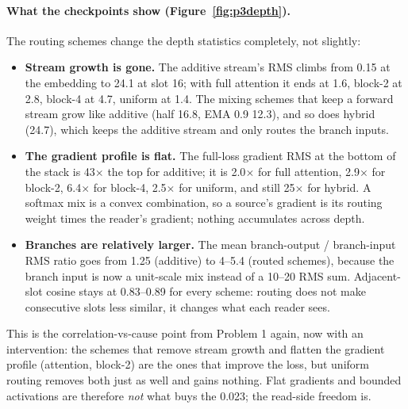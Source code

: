\paragraph{What the checkpoints show (Figure~\ref{fig:p3depth}).} The routing schemes change the depth statistics completely, not slightly:
\begin{itemize}[nosep]
\item \textbf{Stream growth is gone.} The additive stream's RMS climbs from 0.15 at the embedding to 24.1 at slot 16; with full attention it ends at 1.6, block-2 at 2.8, block-4 at 4.7, uniform at 1.4. The mixing schemes that keep a forward stream grow like additive (half 16.8, EMA 0.9 12.3), and so does hybrid (24.7), which keeps the additive stream and only routes the branch inputs.
\item \textbf{The gradient profile is flat.} The full-loss gradient RMS at the bottom of the stack is 43$\times$ the top for additive; it is 2.0$\times$ for full attention, 2.9$\times$ for block-2, 6.4$\times$ for block-4, 2.5$\times$ for uniform, and still 25$\times$ for hybrid. A softmax mix is a convex combination, so a source's gradient is its routing weight times the reader's gradient; nothing accumulates across depth.
\item \textbf{Branches are relatively larger.} The mean branch-output / branch-input RMS ratio goes from 1.25 (additive) to 4--5.4 (routed schemes), because the branch input is now a unit-scale mix instead of a 10--20 RMS sum. Adjacent-slot cosine stays at 0.83--0.89 for every scheme: routing does not make consecutive slots less similar, it changes what each reader sees.
\end{itemize}
This is the correlation-vs-cause point from Problem 1 again, now with an intervention: the schemes that remove stream growth and flatten the gradient profile (attention, block-2) are the ones that improve the loss, but uniform routing removes both just as well and gains nothing. Flat gradients and bounded activations are therefore \emph{not} what buys the 0.023; the read-side freedom is.

